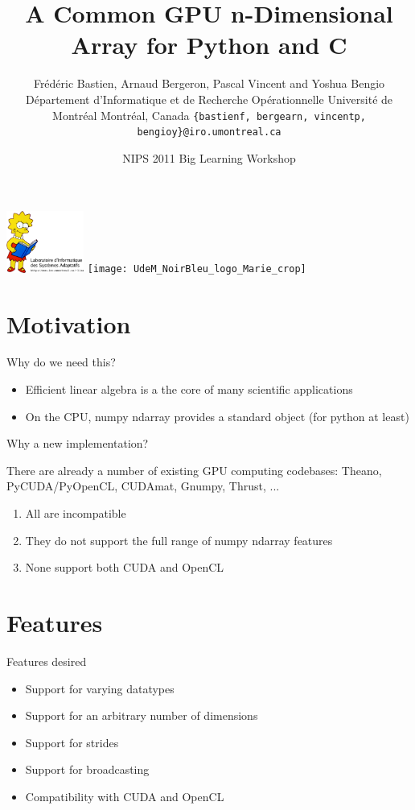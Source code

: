 \documentclass[utf8x,xcolor=pdftex,dvipsnames,table]{beamer}
\title{A Common GPU n-Dimensional Array for Python and C}
\author{
\footnotesize
Frédéric Bastien, Arnaud Bergeron, Pascal Vincent and Yoshua Bengio \newline
Département d'Informatique et de Recherche Opérationnelle \newline
Université de Montréal \newline
Montréal, Canada \newline
\texttt{\{bastienf, bergearn, vincentp, bengioy\}@iro.umontreal.ca}
}
\date{NIPS 2011 Big Learning Workshop}
\begin{document}
\begin{frame}[plain]
 \titlepage
 \includegraphics[width=1in]{lisabook_logo_text_3.png}
 \hfill
 \texttt{[image: UdeM\_NoirBleu\_logo\_Marie\_crop]}
\end{frame}

\setcounter{page}{1}

\section{Motivation}

\begin{frame}{Why do we need this?}
\begin{itemize}
\item Efficient linear algebra is a the core of many scientific applications
\item On the CPU, numpy ndarray provides a standard object (for python at least)
\end{itemize}
\end{frame}

\begin{frame}{Why a new implementation?}
\begin{block}{There are already a number of existing GPU computing codebases:}
Theano, PyCUDA/PyOpenCL, CUDAmat, Gnumpy, Thrust, ...
\end {block}
\begin{enumerate}
\item<2-> All are incompatible
\item<3-> They do not support the full range of numpy ndarray features
\item<4-> None support both CUDA and OpenCL
\end{enumerate}
\end{frame}

\section{Features}
\begin{frame}{Features desired}
\begin{itemize}
\item Support for varying datatypes
\item Support for an arbitrary number of dimensions
\item Support for strides
\item Support for broadcasting
\item Compatibility with CUDA and OpenCL
\end{itemize}
\end{frame}
\end{document}

